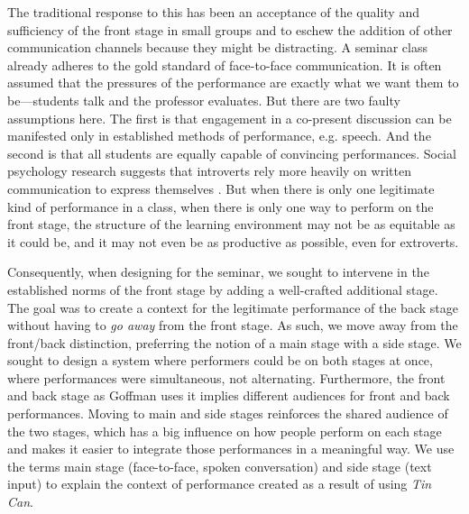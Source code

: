 The traditional response to this has been an acceptance of the quality and sufficiency of the front stage in small groups and to eschew the addition of other communication channels because they might be distracting.  A seminar class already adheres to the gold standard of face-to-face communication. It is often assumed that the pressures of the performance are exactly what we want them to be---students talk and the professor evaluates.  But there are two faulty assumptions here.  The first is that engagement in a co-present discussion can be manifested only in established methods of performance, e.g.  speech. And the second is that all students are equally capable of convincing performances. Social psychology research suggests that introverts rely more heavily on written communication to express themselves \citep{Ross:2009gp. Wilson:2010ib}. But when there is only one legitimate kind of performance in a class, when there is only one way to perform on the front stage, the structure of the learning environment may not be as equitable as it could be, and it may not even be as productive as possible, even for extroverts. 

Consequently, when designing for the seminar, we sought to intervene in the established norms of the front stage by adding a well-crafted additional stage. The goal was to create a context for the legitimate performance of the back stage without having to \emph{go away} from the front stage.  As such, we move away from the front/back distinction, preferring the notion of a main stage with a side stage. We sought to design a system where performers could be on both stages at once, where performances were simultaneous, not alternating. Furthermore, the front and back stage as Goffman uses it implies different audiences for front and back performances. Moving to main and side stages reinforces the shared audience of the two stages, which has a big influence on how people perform on each stage and makes it easier to integrate those performances in a meaningful way. We use the terms main stage (face-to-face, spoken conversation) and side stage (text input) to explain the context of performance created as a result of using \emph{Tin Can}.  


